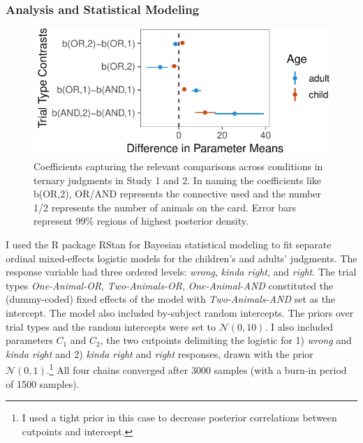 \documentclass[oneside]{report}
\theoremstyle{definition}
\theoremstyle{definition}
\theoremstyle{definition}
\theoremstyle{remark}
\begin{document}
\subsubsection{Analysis and Statistical
Modeling}\label{analysis-and-statistical-modeling}
\begin{figure}[t]

{\centering \includegraphics{figs/stanModelPlot-1} 

}

\caption{Coefficients capturing the relevant comparisons across conditions in ternary judgments in Study 1 and 2. In naming the coefficients like b(OR,2), OR/AND represents the connective used and the number 1/2 represents the number of animals on the card. Error bars represent 99\% regions of highest posterior density.}\label{fig:stanModelPlot}
\end{figure}
I used the R package RStan for Bayesian statistical modeling to fit
separate ordinal mixed-effects logistic models for the children's and
adults' judgments. The response variable had three ordered levels:
\emph{wrong}, \emph{kinda right}, and \emph{right}. The trial types
\emph{One-Animal-OR}, \emph{Two-Animals-OR}, \emph{One-Animal-AND}
constituted the (dummy-coded) fixed effects of the model with
\emph{Two-Animals-AND} set as the intercept. The model also included
by-subject random intercepts. The priors over trial types and the random
intercepts were set to \(\mathcal{N}(0,10)\). I also included parameters
\(C_1\) and \(C_2\), the two cutpoints delimiting the logistic for 1)
\emph{wrong} and \emph{kinda right} and 2) \emph{kinda right} and
\emph{right} responses, drawn with the prior
\(\mathcal{N}(0,1)\).\footnote{I used a tight prior in this case to
  decrease posterior correlations between cutpoints and intercept.} All
four chains converged after 3000 samples (with a burn-in period of 1500
samples).
\end{document}
